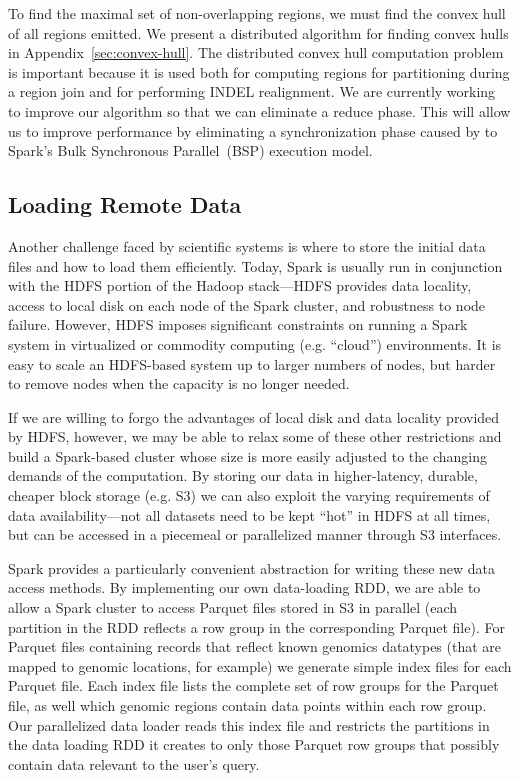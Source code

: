 \documentclass{acm_proc_article-sp}
\begin{document}
To find the maximal set of non-overlapping regions, we must find the convex hull of all regions emitted.
We present a distributed algorithm for finding convex hulls in Appendix~\ref{sec:convex-hull}. The
distributed convex hull computation problem is important because it is used both for computing regions
for partitioning during a region join and for performing INDEL realignment. We are currently working to
improve our algorithm so that we can eliminate a reduce phase. This will allow us to improve
performance by eliminating a synchronization phase caused by to Spark's Bulk Synchronous
Parallel~(BSP) execution model.

\subsection{Loading Remote Data}
\label{sec:loading-remote-data}

Another challenge faced by scientific systems is where to store the initial data files and how to load them
efficiently. Today, Spark is usually run in conjunction with the HDFS portion of the Hadoop stack---HDFS
provides data locality, access to local disk on each node of the Spark cluster, and robustness to node
failure. However, HDFS imposes significant constraints on running a Spark system in virtualized or
commodity computing (e.g. ``cloud'') environments.  It is easy to scale an HDFS-based system up to
larger numbers of nodes, but harder to remove nodes when the capacity is no longer needed.  

If we are willing to forgo the advantages of local disk and data locality provided by HDFS, however, we
may be able to relax some of these other restrictions and build a Spark-based cluster whose size is more
easily adjusted to the changing demands of the computation. By storing our data in higher-latency,
durable, cheaper block storage (e.g. S3) we can also exploit the varying requirements of data \linebreak
availability---not all datasets need to be kept ``hot'' in HDFS at all times, but can be accessed in a
piecemeal or parallelized manner through S3 interfaces.

Spark provides a particularly convenient abstraction for writing these new data access methods.  By
implementing our own data-loading RDD, we are able to allow a Spark cluster to access Parquet files
stored in S3 in parallel (each partition in the RDD reflects a row group in the corresponding Parquet file).
For Parquet files containing records that reflect known genomics datatypes (that are mapped to genomic
locations, for example) we generate simple index files for each Parquet file.  Each index file lists the
complete set of row groups for the Parquet file, as well which genomic regions contain data points within
each row group.  Our parallelized data loader reads this index file and restricts the partitions in the data
loading RDD it creates to only those Parquet row groups that possibly contain data relevant to the
user's query.
\end{document}
